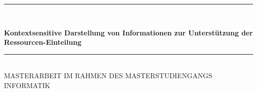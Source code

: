 
\begin{titlepage}




\begin{center}


\newcommand{\HRule}{\rule{\linewidth}{0.5mm}}
\HRule \\[0.4cm]

{ \huge \bfseries Kontextsensitive Darstellung von Informationen zur Unterstützung der Ressourcen-Einteilung}\\ [0.4cm]%
\HRule \\[1cm]

\textsc{\large MASTERARBEIT IM RAHMEN DES
MASTERSTUDIENGANGS INFORMATIK}\\[2cm]

\end{center}
\end{titlepage}

